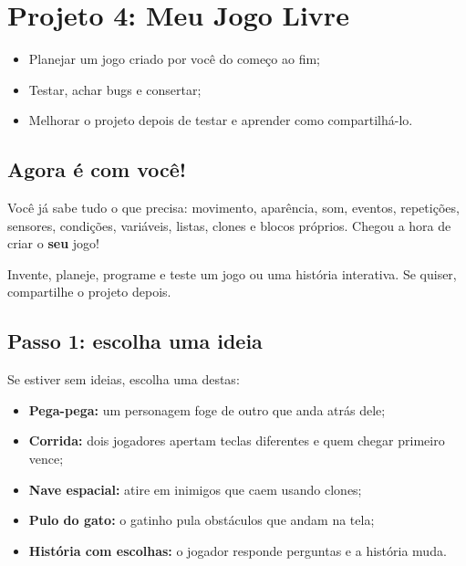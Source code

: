\chapter{Projeto 4: Meu Jogo Livre}

\begin{objetivos}
\begin{itemize}
\item Planejar um jogo criado por você do começo ao fim;
\item Testar, achar bugs e consertar;
\item Melhorar o projeto depois de testar e aprender como compartilhá-lo.
\end{itemize}
\end{objetivos}

\section{Agora é com você!}

Você já sabe tudo o que precisa: movimento, aparência, som, eventos, repetições, sensores, condições, variáveis, listas, clones e blocos próprios. Chegou a hora de criar o \textbf{seu} jogo!

\begin{missao}
Invente, planeje, programe e teste um jogo ou uma história interativa. Se quiser, compartilhe o projeto depois.
\end{missao}

\section{Passo 1: escolha uma ideia}

Se estiver sem ideias, escolha uma destas:

\begin{itemize}
\item \textbf{Pega-pega:} um personagem foge de outro que anda atrás dele;
\item \textbf{Corrida:} dois jogadores apertam teclas diferentes e quem chegar primeiro vence;
\item \textbf{Nave espacial:} atire em inimigos que caem usando clones;
\item \textbf{Pulo do gato:} o gatinho pula obstáculos que andam na tela;
\item \textbf{História com escolhas:} o jogador responde perguntas e a história muda.
\end{itemize}

